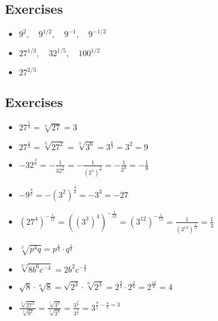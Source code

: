 \documentclass{hw}
\begin{document}
\subsection*{\normalsize Exercises}
\begin{itemize}
\item $9^2, \quad 9^{1/2}, \quad 9^{-1}, \quad 9^{-1/2}$
\item $27^{1/3}, \quad 32^{1/5}, \quad 100^{1/2}$
\item $27^{2/3}$
\end{itemize}

\subsection*{\normalsize Exercises}
\begin{itemize}
    \item $27^\frac{1}{3} = \sqrt[3]{27} = 3$
    \item $27^\frac{2}{3} = \sqrt[3]{27^2} = \sqrt[3]{3^6} = 3^\frac{6}{3} = 3^2 = 9$
    \item $-32^\frac{3}{5} = -\frac{1}{32^\frac{3}{5}} = -\frac{1}{(2^{5})^\frac{3}{5}} = -\frac{1}{2^3} = -\frac{1}{8}$
    \item $-9^\frac{3}{2} = -(3^2)^\frac{3}{2} = -3^3 = -27$
    \item $(27^4)^{-\frac{1}{12}} = ((3^3)^4)^{-\frac{1}{12}} = (3^{12})^{-\frac{1}{12}} = \frac{1}{(3^{12})^{\frac{1}{12}}} = \frac{1}{3}$
    \item $\sqrt[3]{p^4q} = p^\frac{4}{3} \cdot q^\frac{1}{3}$
    \item $\sqrt[3]{8b^6c^{-4}} = 2b^{2}c^{-\frac{4}{3}}$
    \item $\sqrt{8} \cdot \sqrt[6]{8} = \sqrt{2^3} \cdot \sqrt[6]{2^3} = 2^\frac{3}{2} \cdot 2^\frac{3}{6} = 2^\frac{12}{6} = 4$
    \item $\frac{\sqrt[5]{27^3}}{\sqrt[5]{9^2}} = \frac{\sqrt[5]{3^9}}{\sqrt[5]{3^4}} = \frac{3^\frac{9}{5}}{3^\frac{4}{5}} = 3^{\frac{9}{5} - \frac{4}{5} = 3}$
\end{itemize}

%
% 
%
%
% 
\end{document}
